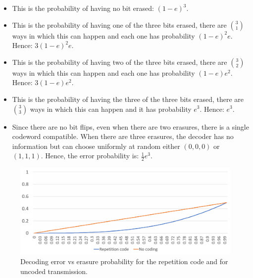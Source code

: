 \begin{solution}
\begin{itemize}
\item This is the probability of having no bit erased: $(1-e)^3$.
\item This is the probability of having one of the three bits erased, there are $3\choose 1$ ways in which this can happen and each one has probability $(1-e)^2e$. Hence: $3(1-e)^2e$.
\item This is the probability of having two of the three bits erased, there are $3\choose 2$ ways in which this can happen and each one has probability $(1-e)e^2$. Hence: $3(1-e)e^2$.
\item This is the probability of having the three of the three bits erased, there are $3\choose 3$ ways in which this can happen and it has probability $e^3$. Hence: $e^3$.
\item Since there are no bit flips, even when there are two erasures, there is a single codeword compatible. When there are three erasures, the decoder has no information but can choose uniformly at random either $(0,0,0)$ or $(1,1,1)$. Hence, the error probability is: $\frac{1}{2}e^3$.
\end{itemize}
\begin{figure}[h!]
\begin{center}
\def\svgwidth{\columnwidth} 
\includegraphics[width=\linewidth]{figures/becrepcode.png} 
\caption{Decoding error vs erasure probability for the repetition code and for uncoded transmission.}
\label{fig:bscrep}
\end{center}
\end{figure}
\end{solution}
